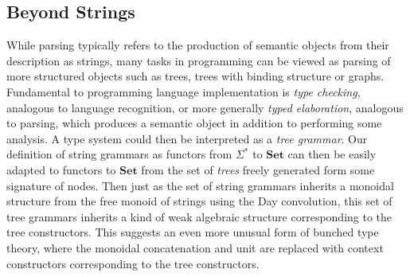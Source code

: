 \documentclass[sigconf,anonymous,review,screen]{acmart}
\newcommand{\Set}{\mathbf{Set}}
\begin{document}
\subsection{Beyond Strings}

While parsing typically refers to the production of semantic objects
from their description as strings, many tasks in programming can be
viewed as parsing of more structured objects such as trees, trees with
binding structure or graphs. Fundamental to programming language
implementation is \emph{type checking}, analogous to language
recognition, or more generally \emph{typed elaboration}, analogous to
parsing, which produces a semantic object in addition to performing
some analysis. A type system could then be interpreted as a \emph{tree
grammar}. Our definition of string grammars as functors from
$\Sigma^*$ to $\Set$ can then be easily adapted to functors to $\Set$
from the set of \emph{trees} freely generated form some signature of
nodes. Then just as the set of string grammars inherits a monoidal
structure from the free monoid of strings using the Day convolution,
this set of tree grammars inherits a kind of weak algebraic structure
corresponding to the tree constructors. This suggests an even more
unusual form of bunched type theory, where the monoidal concatenation
and unit are replaced with context constructors corresponding to the
tree constructors.
\end{document}
